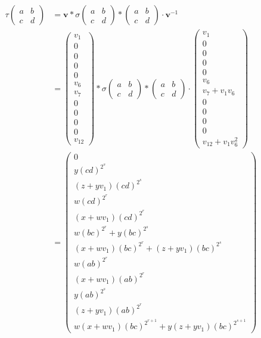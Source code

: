 \begin{align*}
\tau\left(\begin{matrix} a & b \\ c & d \end{matrix}\right) &=
\mathbf{v}*\sigma\left(\begin{matrix} a & b \\ c & d \end{matrix}\right) *
\left(\begin{matrix} a & b \\ c & d \end{matrix}\right) \cdot \mathbf{v}^{-1}\\
&=
\left(\begin{matrix} 
v_1  \\
0 \\
0 \\
0 \\
0 \\
v_6 \\
v_7 \\
0 \\
0 \\
0 \\
0 \\
v_{12}
\end{matrix}\right)
*\sigma\left(\begin{matrix} a & b \\ c & d \end{matrix}\right) *
\left(\begin{matrix} a & b \\ c & d \end{matrix}\right) \cdot 
\left(\begin{matrix} 
v_1  \\
0 \\
0 \\
0 \\
0 \\
v_6 \\
v_7 + v_1v_6 \\
0 \\
0 \\
0 \\
0 \\
v_{12} + v_1v_6^2
\end{matrix}\right)\\
&=
\left(\begin{matrix}
0 \\
y(cd)^{2^s} \\
(z+yv_1)(cd)^{2^s} \\
w(cd)^{2^r} \\
(x+wv_1)(cd)^{2^r} \\
w(bc)^{2^r} + y(bc)^{2^s} \\
(x+wv_1)(bc)^{2^r} + (z+yv_1)(bc)^{2^s} \\
w(ab)^{2^r} \\
(x+wv_1)(ab)^{2^r}  \\
y(ab)^{2^s} \\
(z+yv_1)(ab)^{2^r} \\
w(x+wv_1)(bc)^{2^{r+1}} + y(z+yv_1)(bc)^{2^{s+1}}
\end{matrix}\right)
\end{align*}

